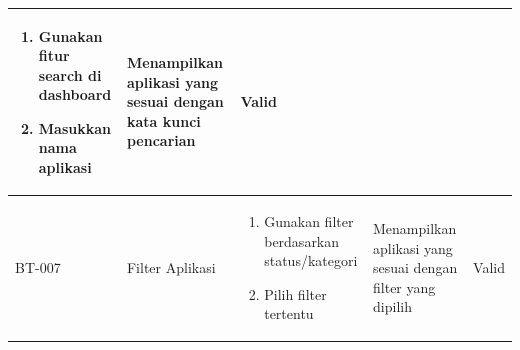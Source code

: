 \begin{table}[h]
\begin{adjustbox}{width=\textwidth}
\begin{tabular}{|p{0.8cm}|p{2.2cm}|p{4cm}|p{3.5cm}|p{1.2cm}|}
\begin{enumerate}[leftmargin=*,noitemsep,topsep=0pt,label=\arabic*.,widest=99]
                                                        \item Gunakan fitur search di dashboard
                                                        \item Masukkan nama aplikasi
                                                      \end{enumerate} & Menampilkan aplikasi yang sesuai dengan kata kunci pencarian       & Valid                                                                          \\ \hline
      BT-007            & Filter Aplikasi           & \begin{enumerate}[leftmargin=*,noitemsep,topsep=0pt,label=\arabic*.,widest=99]
                                                        \item Gunakan filter berdasarkan status/kategori
                                                        \item Pilih filter tertentu
                                                      \end{enumerate} & Menampilkan aplikasi yang sesuai dengan filter yang dipilih        & Valid                                                                          \\ \hline
    \end{tabular}
  \end{adjustbox}
\end{table}

